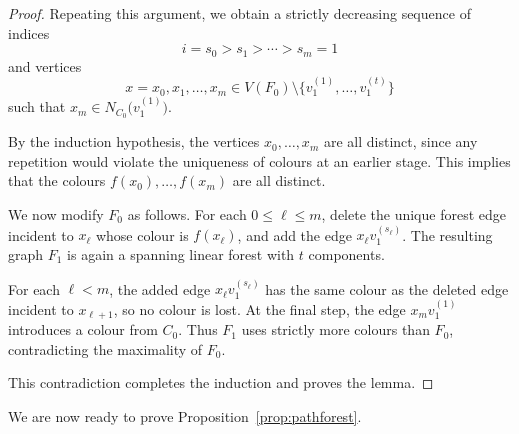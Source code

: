 \documentclass[11pt,reqno]{amsart}
\theoremstyle{definition}
\theoremstyle{remark}
\renewcommand\le{\leqslant}
\begin{document}
\begin{proof}
Repeating this argument, we obtain a strictly decreasing sequence of indices
\[
i=s_0>s_1>\cdots>s_m=1
\]
and vertices
\[
x=x_0,x_1,\ldots,x_m \in V(F_0)\setminus \{v_1^{(1)},\ldots,v_1 ^{(t)}\}
\]
such that $x_m\in N_{C_0}\!\big(v_1^{(1)}\big)$.



By the induction hypothesis, the vertices $x_0,\ldots,x_m$ are all distinct, since
any repetition would violate the uniqueness of colours at an earlier stage.
This implies that the colours $f(x_0),\ldots,f(x_m)$ are all distinct.

We now modify $F_0$ as follows.
For each $0\le\ell\le m$, delete the unique forest edge incident to $x_\ell$ whose
colour is $f(x_\ell)$, and add the edge $x_\ell v_1^{(s_\ell)}$.
The resulting graph $F_1$ is again a spanning linear forest with $t$ components.

For each $\ell<m$, the added edge $x_\ell v_1^{(s_\ell)}$ has the same colour as the
deleted edge incident to $x_{\ell+1}$, so no colour is lost.
At the final step, the edge $x_m v_1^{(1)}$ introduces a colour from $C_0$.
Thus $F_1$ uses strictly more colours than $F_0$, contradicting the maximality of $F_0$.

This contradiction completes the induction and proves the lemma.
\end{proof}

We are now ready to prove Proposition~\ref{prop:pathforest}.
\end{document}
